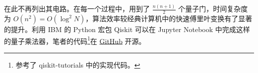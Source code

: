 在此不再列出其电路。在每一个过程中，用到了 $\frac{n(n+1)}{2}$ 个量子门，时间复杂度为 $O(n^2)=O(\log^2 N)$，算法效率较经典计算机中的快速傅里叶变换有了显著的提升。利用 IBM 的 Python 宏包 Qiskit 可以在 Jupyter Notebook 中完成这样的量子乘法器，笔者的代码\footnote{参考了 qiskit-tutorials 中的实现代码\cite{Qiskit}。}在 \href{https://github.com/Conless/quantum-computing-intro/blob/main/src/qft.ipynb}{GitHub} 开源。
